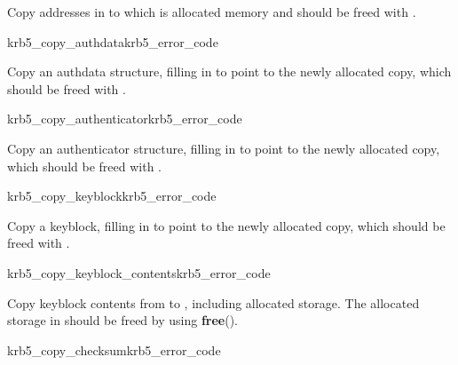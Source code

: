 Copy addresses in  to  which is
allocated memory and should be freed with .

\begin{funcdecl}{krb5_copy_authdata}{krb5_error_code}{\funcinout}
\funcin
{}
\funcout
{}
\end{funcdecl}

Copy an authdata structure, filling in  to point to the
newly allocated copy, which should be freed with 
.

\begin{funcdecl}{krb5_copy_authenticator}{krb5_error_code}{\funcinout}
\funcin
{}
\funcout
{}
\end{funcdecl}

Copy an authenticator structure, filling in  to
point to the newly allocated copy, which should be freed with 
.

\begin{funcdecl}{krb5_copy_keyblock}{krb5_error_code}{\funcinout}
\funcin
{}
\funcout
{}
\end{funcdecl}

Copy a keyblock, filling in  to point to the newly
allocated copy, which should be freed with
. 

\begin{funcdecl}{krb5_copy_keyblock_contents}{krb5_error_code}{\funcinout}
\funcin
{}
\funcout
{}
\end{funcdecl}

Copy keyblock contents from  to , including
allocated storage.  The allocated storage in  should be
freed by using {\bf free}().

\begin{funcdecl}{krb5_copy_checksum}{krb5_error_code}{\funcinout}
\funcin
{}
\funcout
{}
\end{funcdecl}

